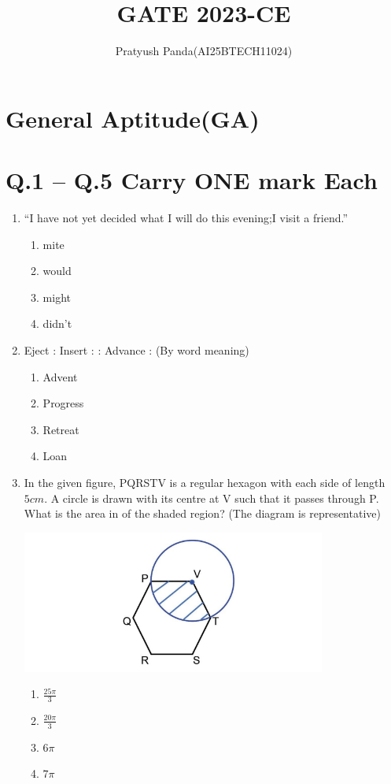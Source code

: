 \documentclass[journal,14pt,onecolumn]{IEEEtran}
\theoremstyle{remark}
\begin{document}
\title{GATE 2023-CE}
\author{Pratyush Panda(AI25BTECH11024)}
\maketitle

\section*{General Aptitude(GA)}
\section*{Q.1 – Q.5 Carry ONE mark Each}
\vspace{1cm}
\begin{enumerate}[label={Q\arabic*.}]
\item “I have not yet decided what I will do this evening;I\underline{\hspace{2cm}} visit a friend.”
\begin{enumerate}
    \item mite
    \item would
    \item might
    \item didn't
\end{enumerate}
\vspace{1cm}
\item Eject : Insert : : Advance : \underline{\hspace{2cm}}
(By word meaning)
\begin{enumerate}
    \item Advent
    \item Progress
    \item Retreat
    \item Loan
\end{enumerate}
\vspace{1cm}
\item In the given figure, PQRSTV is a regular hexagon with each side of length $5 cm$. A
circle is drawn with its centre at V such that it passes through P. What is the area in  of the shaded region? (The diagram is representative)

\includegraphics[width=10cm]{pics/Screenshot 2025-08-02 104931.png}
\begin{enumerate}
    \item \Large$\frac{25\pi}{3}$
    \item \Large$\frac{20\pi}{3}$
    \item \Large$6\pi$
    \item \Large$7\pi$
\end{enumerate}


\end{enumerate}
\end{document}
